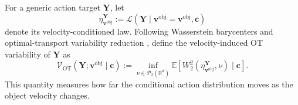 \documentclass[10pt,twocolumn,letterpaper]{article}
\begin{document}
For a generic action target $\mathbf Y$, let
\[
    \eta_{\mathbf v^{\mathrm{obj}}}^{\mathbf Y}
    :=
    \mathcal L(\mathbf Y \mid \mathbf v^{\mathrm{obj}}=\mathbf v^{\mathrm{obj}},\mathbf c)
\]
denote its velocity-conditioned law. Following Wasserstein barycenters and
optimal-transport variability reduction
\citep{agueh2011barycenters,villani2009optimal,hung2022variability}, define the
velocity-induced OT variability of $\mathbf Y$ as
\begin{equation}
    \mathcal V_{\mathrm{OT}}(\mathbf Y;\mathbf v^{\mathrm{obj}}\mid\mathbf c)
    :=
    \inf_{\nu\in\mathcal P_2(\mathbb R^d)}
    \mathbb E
    \left[
        W_2^2
        \left(
            \eta_{\mathbf v^{\mathrm{obj}}}^{\mathbf Y},
            \nu
        \right)
        \mid \mathbf c
    \right].
    \label{eq:velocity_ot_variability}
\end{equation}
This quantity measures how far the conditional action distribution moves as the
object velocity changes.
\end{document}
